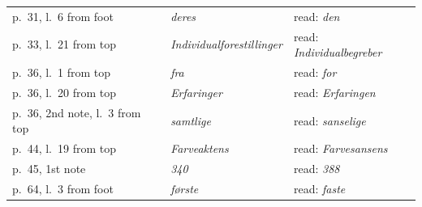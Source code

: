 \documentclass[12pt]{book}
\begin{document}
\begin{center}
\begin{tabular}{@{}l@{\quad}l@{\quad}l@{}}
p.\ 31, l.\ 6 from foot & \textit{deres} & read: \textit{den}\\
p.\ 33, l.\ 21 from top & \textit{Individualforestillinger} & read: \textit{Individualbegreber}\\
p.\ 36, l.\ 1 from top & \textit{fra} & read: \textit{for}\\
p.\ 36, l.\ 20 from top & \textit{Erfaringer} & read: \textit{Erfaringen}\\
p.\ 36, 2nd note, l.\ 3 from top & \textit{samtlige} & read: \textit{sanselige}\\
p.\ 44, l.\ 19 from top & \textit{Farveaktens} & read: \textit{Farvesansens}\\
p.\ 45, 1st note & \textit{340} & read: \textit{388}\\
p.\ 64, l.\ 3 from foot & \textit{første} & read: \textit{faste}\\
\end{tabular}
\end{center}
\end{document}

